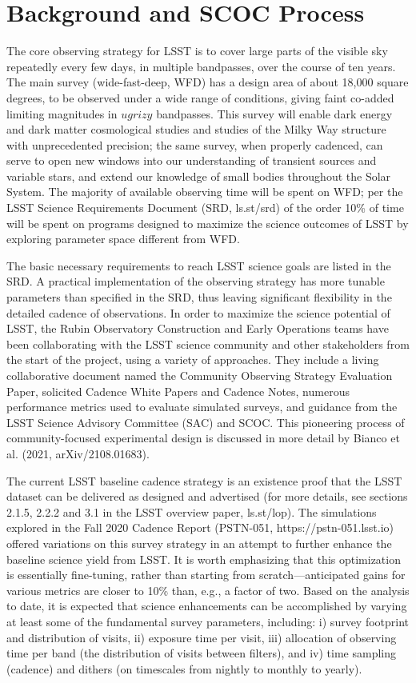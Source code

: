 \section{Background and SCOC Process}

The core observing strategy for LSST is to cover large parts of the visible sky repeatedly every few days, in multiple bandpasses, over the course of ten years. The main survey (wide-fast-deep, WFD) has a design area of about 18,000 square degrees, to be observed under a wide range of conditions, giving faint co-added limiting magnitudes in $ugrizy$ bandpasses. This survey will enable dark energy and dark matter cosmological studies and studies of the Milky Way structure with unprecedented precision; the same survey, when properly cadenced, can serve to open new windows into our understanding of transient sources and variable stars, and extend our knowledge of small bodies throughout the Solar System. The majority of available observing time will be spent on WFD; per the LSST Science Requirements Document (SRD, ls.st/srd) of the order 10\% of time will be spent on programs designed to maximize the science outcomes of LSST by exploring parameter space different from WFD. 

The basic necessary requirements to reach LSST science goals are listed in the SRD. A practical implementation of the observing strategy has more tunable parameters than specified in the SRD, thus leaving significant flexibility in the detailed cadence of observations. In order to maximize the science potential of LSST, the Rubin Observatory Construction and Early Operations teams have been collaborating with the LSST science community and other stakeholders from the start of the project, using a variety of approaches. They include a living collaborative document named the Community Observing Strategy Evaluation Paper, solicited Cadence White Papers and Cadence Notes, numerous performance metrics used to evaluate simulated surveys, and guidance from the LSST Science Advisory Committee (SAC) and SCOC. This pioneering process of community-focused experimental design is discussed in more detail by Bianco et al. (2021, arXiv/2108.01683). 

The current LSST baseline cadence strategy is an existence proof that the LSST dataset can be delivered as designed and advertised (for more details, see sections 2.1.5, 2.2.2 and 3.1 in the LSST overview paper, ls.st/lop). The simulations explored in the Fall 2020 Cadence Report (PSTN-051, https://pstn-051.lsst.io) offered variations on this survey strategy in an attempt to further enhance the baseline science yield from LSST. It is worth emphasizing that this optimization is essentially fine-tuning, rather than starting from scratch—anticipated gains for various metrics are closer to 10\% than, e.g., a factor of two. Based on the analysis to date, it is expected that science enhancements can be accomplished by varying at least some of the fundamental survey parameters, including: i) survey footprint and distribution of visits,  ii) exposure time per visit, iii) allocation of observing time per band (the distribution of visits between filters), and iv) time sampling (cadence) and dithers (on timescales from nightly to monthly to yearly). 

